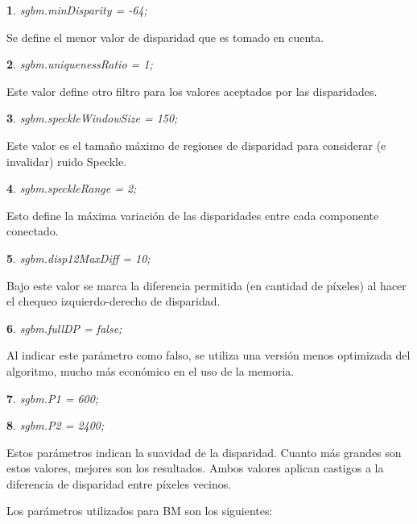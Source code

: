 \documentclass[11pt,a4paper,titlepage]{article}
\newtheorem{mytheorem}{}
\newenvironment{theorem}%
  {\begin{lrbox}{\thmbox}%
   \begin{minipage}{\dimexpr\linewidth-2\fboxsep}
   \begin{mytheorem}}%
  {\end{mytheorem}%
   \end{minipage}%
   \end{lrbox}%
   \begin{trivlist}
     \item[]\colorbox{lightgray}{\usebox\thmbox}
   \end{trivlist}}
\begin{document}
\begin{theorem}
sgbm.minDisparity = -64;
\end{theorem}

Se define el menor valor de disparidad que es tomado en cuenta.

\begin{theorem}
sgbm.uniquenessRatio = 1;
\end{theorem}

Este valor define otro filtro para los valores aceptados por las disparidades.

\begin{theorem}
sgbm.speckleWindowSize = 150;
\end{theorem}

Este valor es el tamaño máximo de regiones de disparidad para considerar (e invalidar) ruido Speckle.

\begin{theorem}
sgbm.speckleRange = 2;
\end{theorem}

Esto define la máxima variación de las disparidades entre cada componente conectado.

\begin{theorem}
sgbm.disp12MaxDiff = 10;
\end{theorem}

Bajo este valor se marca la diferencia permitida (en cantidad de píxeles) al hacer el chequeo izquierdo-derecho de disparidad.

\begin{theorem}
sgbm.fullDP = false;
\end{theorem}

Al indicar este parámetro como falso, se utiliza una versión menos optimizada del algoritmo, mucho más económico en el uso de la memoria.

\begin{theorem}
sgbm.P1 = 600;
\end{theorem}
\begin{theorem}
sgbm.P2 = 2400;
\end{theorem}

Estos parámetros indican la suavidad de la disparidad. Cuanto más grandes son estos valores, mejores son los resultados. Ambos valores aplican castigos a la diferencia de disparidad entre píxeles vecinos.


Los parámetros utilizados para BM son los siguientes:
\end{document}
